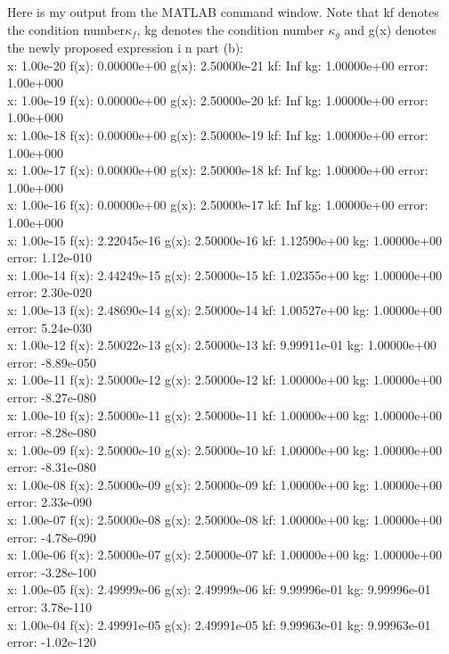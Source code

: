 \documentclass[12pt]{article}
\begin{document}
Here is my output from the MATLAB command window. Note that kf denotes the condition number$\kappa_f$, kg denotes the condition number $\kappa_g$ and g(x) denotes the newly proposed expression i n part (b):\\
x: 1.00e-20 f(x): 0.00000e+00 g(x): 2.50000e-21 kf:         Inf kg:  1.00000e+00 error:  1.00e+000\\
x: 1.00e-19 f(x): 0.00000e+00 g(x): 2.50000e-20 kf:         Inf kg:  1.00000e+00 error:  1.00e+000 \\
x: 1.00e-18 f(x): 0.00000e+00 g(x): 2.50000e-19 kf:         Inf kg:  1.00000e+00 error:  1.00e+000 \\
x: 1.00e-17 f(x): 0.00000e+00 g(x): 2.50000e-18 kf:         Inf kg:  1.00000e+00 error:  1.00e+000 \\
x: 1.00e-16 f(x): 0.00000e+00 g(x): 2.50000e-17 kf:         Inf kg:  1.00000e+00 error:  1.00e+000 \\
x: 1.00e-15 f(x): 2.22045e-16 g(x): 2.50000e-16 kf: 1.12590e+00 kg:  1.00000e+00 error:  1.12e-010 \\
x: 1.00e-14 f(x): 2.44249e-15 g(x): 2.50000e-15 kf: 1.02355e+00 kg:  1.00000e+00 error:  2.30e-020 \\
x: 1.00e-13 f(x): 2.48690e-14 g(x): 2.50000e-14 kf: 1.00527e+00 kg:  1.00000e+00 error:  5.24e-030 \\
x: 1.00e-12 f(x): 2.50022e-13 g(x): 2.50000e-13 kf: 9.99911e-01 kg:  1.00000e+00 error: -8.89e-050 \\
x: 1.00e-11 f(x): 2.50000e-12 g(x): 2.50000e-12 kf: 1.00000e+00 kg:  1.00000e+00 error: -8.27e-080 \\
x: 1.00e-10 f(x): 2.50000e-11 g(x): 2.50000e-11 kf: 1.00000e+00 kg:  1.00000e+00 error: -8.28e-080 \\
x: 1.00e-09 f(x): 2.50000e-10 g(x): 2.50000e-10 kf: 1.00000e+00 kg:  1.00000e+00 error: -8.31e-080 \\
x: 1.00e-08 f(x): 2.50000e-09 g(x): 2.50000e-09 kf: 1.00000e+00 kg:  1.00000e+00 error:  2.33e-090 \\
x: 1.00e-07 f(x): 2.50000e-08 g(x): 2.50000e-08 kf: 1.00000e+00 kg:  1.00000e+00 error: -4.78e-090 \\
x: 1.00e-06 f(x): 2.50000e-07 g(x): 2.50000e-07 kf: 1.00000e+00 kg:  1.00000e+00 error: -3.28e-100 \\
x: 1.00e-05 f(x): 2.49999e-06 g(x): 2.49999e-06 kf: 9.99996e-01 kg:  9.99996e-01 error:  3.78e-110 \\
x: 1.00e-04 f(x): 2.49991e-05 g(x): 2.49991e-05 kf: 9.99963e-01 kg:  9.99963e-01 error: -1.02e-120 \\
\end{document}
